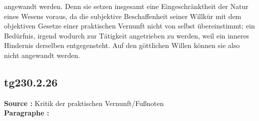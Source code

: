 \documentclass[a4paper,12pt,twoside]{book}
\begin{document}
angewandt werden. Denn sie setzen insgesamt eine Eingeschränktheit der Natur eines Wesens voraus, da die subjektive Beschaffenheit seiner Willkür mit dem objektiven Gesetze einer praktischen Vernunft nicht von selbst übereinstimmt; ein Bedürfnis, irgend wodurch zur Tätigkeit angetrieben zu werden, weil ein inneres Hindernis derselben entgegensteht. Auf den göttlichen Willen können sie also nicht angewandt werden. 
	
	\subsection*{tg230.2.26} 
	\textbf{Source : }Kritik der praktischen Vernunft/Fußnoten\\  
	
	\noindent\textbf{Paragraphe : }
	
\end{document}
